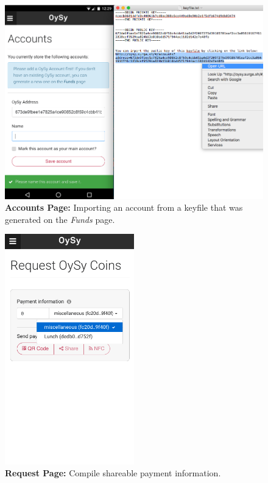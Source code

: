 \begin{figure}
\centering
\includegraphics[width=1\textwidth]{screenshots/Accounts-Import.png}
\caption{\label{fig:uiaccounts2}\textbf{Accounts Page:} Importing an account from a keyfile that was generated on the \textit{Funds} page.}
\end{figure}


\begin{figure}
\centering
\includegraphics[width=0.5\textwidth]{screenshots/Request-1.png}
\caption{\label{fig:uirequest1}\textbf{Request Page:} Compile shareable payment information.}
\end{figure}

